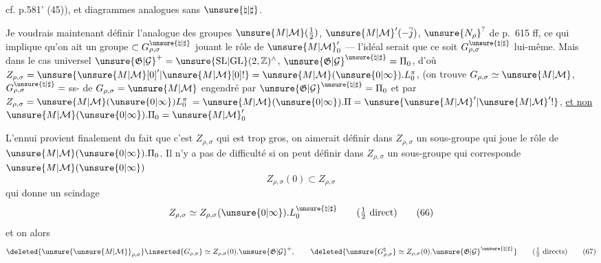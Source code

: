 cf. p.581' (45)), et diagrammes analogues sans $\unsure{\natural|\sharp}$.





Je voudrais maintenant définir l'analogue des groupes
$\unsure{M|\mathcal{M}}(\tfrac12)$, $\unsure{M|\mathcal{M}}'(-\overline j)$,
$\unsure{N_\rho}^{?}$
de p.~615 ff,
ce qui implique qu'on ait un groupe $\subset G_{\rho,\sigma}^{\unsure{\natural|\sharp}}$
jouant le rôle de $\unsure{M|\mathcal{M}}'_0$ --- l'idéal serait que ce soit
$G_{\rho,\sigma}^{\unsure{\natural|\sharp}}$ lui-même.
Mais dans le cas universel
$\unsure{\mathfrak{G}|\mathcal{G}}^+=\unsure{\mathrm{SL}|\mathrm{GL}}(2,\mathbb Z)^\wedge$,
$\unsure{\mathfrak{G}|\mathcal{G}}^{\unsure{\natural|\sharp}}=\Pi_0$,
d'où
$Z_{\rho,\sigma}=\unsure{\unsure{M|\mathcal{M}}[0]'|\unsure{M|\mathcal{M}}[0]!}=\unsure{M|\mathcal{M}}(\unsure{0|\infty}).L_0^\pi$,
(on trouve $G_{\rho,\sigma}\simeq \unsure{M|\mathcal{M}}$,
$G_{\rho,\sigma}^{\unsure{\natural|\sharp}}={}$ss-
de $G_{\rho,\sigma}=\unsure{M|\mathcal{M}}$ engendré par
$\unsure{\mathfrak{G}|\mathcal{G}}^{\unsure{\natural|\sharp}}=\Pi_0$
et par $Z_{\rho,\sigma}=\unsure{M|\mathcal{M}}(\unsure{0|\infty})L_0^\pi$
$=\unsure{M|\mathcal{M}}(\unsure{0|\infty}).\Pi=\unsure{\unsure{M|\mathcal{M}}'|\unsure{M|\mathcal{M}}'!}$,
\uline{et non} $\unsure{M|\mathcal{M}}(\unsure{0|\infty}).\Pi_0=\unsure{M|\mathcal{M}}'_0$\deleted{$\unsure{!}$}

L'ennui provient finalement du fait que c'est $Z_{\rho,\sigma}$
qui est trop gros, on aimerait définir dans $Z_{\rho,\sigma}$ un sous-groupe
qui joue le rôle de $\unsure{M|\mathcal{M}}(\unsure{0|\infty}).\Pi_0$. Il n'y a pas de difficulté si on peut définir
dans  $Z_{\rho,\sigma}$ un sous-groupe qui
corresponde  $\unsure{M|\mathcal{M}}(\unsure{0|\infty})$
\[
Z_{\rho,\sigma}(0)\subset Z_{\rho,\sigma}
\tag{65}
\]
qui donne un scindage
\[
Z_{\rho,\sigma}\simeq Z_{\rho,\sigma}(\unsure{0|\infty}).L_0^{\unsure{\natural|\sharp}}
\qquad (\tfrac12\ \text{direct})
\tag{66}
\]
et on  alors
\[
\deleted{\unsure{\unsure{M|\mathcal{M}}}_{\rho,\sigma}}\inserted{G_{\rho,\sigma}}
\simeq Z_{\rho,\sigma}(0).\unsure{\mathfrak{G}|\mathcal{G}}^+,
\qquad
\deleted{\unsure{G_{\rho,\sigma}^{\natural}}\simeq
Z_{\rho,\sigma}(0).\unsure{\mathfrak{G}|\mathcal{G}}^{\unsure{\natural|\sharp}}}
\qquad (\tfrac12\ \text{directs})
\tag{67}
\]



